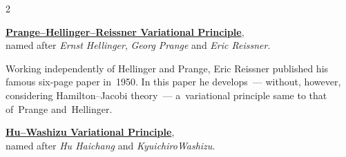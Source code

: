 

\label{para:mixedvariationalprinciples}

\begin{changemargin}{2\parindent}{\parindent}
\bgroup %
\setlength{\parindent}{\negparindent}
\small

\hspace{\parindent}\href{https://en.wikiversity.org/wiki/Introduction_to_Elasticity/Hellinger-Reissner_principle}{\textbf{Prange\hbox{--}Hellinger\hbox{--}Reissner Variational Principle}},\\
named after \emph{Ernst Hellinger}, \emph{Georg Prange} and \emph{Eric Reissner}.
\par

\nopagebreak\vspace{.16em}
{\scriptsize \noindent Working independently of Hellinger and Prange, Eric Reissner published his famous six\hbox{-}page paper  in~1950. In this paper he develops~--- without, however, considering Hamilton\hbox{--}Jacobi theory~--- a~variational principle same to that of~Prange and~Hellinger.\par}

\nopagebreak\vspace{.32em}
\href{https://en.wikiversity.org/wiki/Introduction_to_Elasticity/Hu-Washizu_principle}{\textbf{Hu\hbox{--}Washizu Variational Principle}},\\
named after \emph{Hu Haichang} and \emph{Kyuichiro\;Washizu}.
\par
\egroup
\nopagebreak\vspace{.1em}
\end{changemargin}

